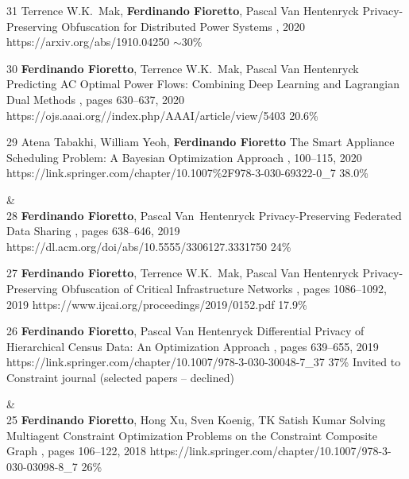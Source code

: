 \begin{pubs}
	\confentry
		{31} %
		{Terrence W.K.~Mak, {\bf Ferdinando Fioretto}, Pascal Van Hentenryck}
		{Privacy-Preserving Obfuscation for Distributed Power Systems}
		{\procPSCC, 2020}
		{https://arxiv.org/abs/1910.04250}
	    {$\sim$30\%} %

	\confentry
		{30} %
		{{\bf Ferdinando Fioretto}, Terrence W.K.~Mak, Pascal Van Hentenryck}
		{Predicting AC Optimal Power Flows: Combining Deep Learning and Lagrangian Dual Methods}
	  	{\procAAAI, pages 630--637, 2020}
	  	{https://ojs.aaai.org//index.php/AAAI/article/view/5403}
	    {20.6\%} %

	\confentry
		{29} %
	    {Atena Tabakhi, William Yeoh, {\bf Ferdinando Fioretto}}
	    {The Smart Appliance Scheduling Problem: A Bayesian Optimization Approach}
	    {\procPRIMA, 100--115, 2020}
	    {https://link.springer.com/chapter/10.1007\%2F978-3-030-69322-0\_7}
	    {38.0\%} %

{}&\nemph{\rule{0.5\linewidth}{0.5pt}}\\[1em]
	\confentry
		{28} %
		{{\bf Ferdinando Fioretto}, Pascal Van~Hentenryck}
		{Privacy-Preserving Federated Data Sharing}
	  	{\procAAMAS, pages 638--646, 2019}
	  	{https://dl.acm.org/doi/abs/10.5555/3306127.3331750}
		{24\%} %

	\confentry
		{27} %
		{{\bf Ferdinando Fioretto}, Terrence W.K.~Mak, Pascal Van Hentenryck}
		{Privacy-Preserving Obfuscation of Critical Infrastructure Networks}
	  	{\procIJCAI, pages 1086--1092, 2019}
	  	{https://www.ijcai.org/proceedings/2019/0152.pdf}
	    {17.9\%} %

	\confentryAwd
		{26} %
		{{\bf Ferdinando Fioretto}, Pascal Van Hentenryck}
		{Differential Privacy of Hierarchical Census Data: An Optimization Approach} 
		{\procCP, pages 639--655, 2019}
		{https://link.springer.com/chapter/10.1007/978-3-030-30048-7\_37}
		{37\%}
		{Invited to Constraint journal}
		{(selected papers -- declined)}

{}&\nemph{\rule{0.5\linewidth}{0.5pt}}\\[1em]
	\confentry 
		{25} %
		{{\bf Ferdinando Fioretto}, Hong Xu, Sven Koenig, TK Satish Kumar}
	 	{Solving Multiagent Constraint Optimization Problems on the Constraint Composite Graph}
		{\procPRIMA, pages 106--122, 2018}
		{https://link.springer.com/chapter/10.1007/978-3-030-03098-8\_7}
	    {26\%} %


\end{pubs}
